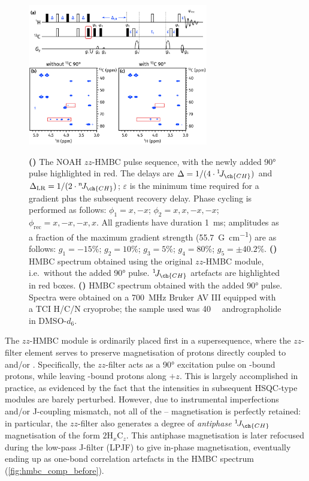 \documentclass[a4paper,11pt]{article}
\newcommand{\proton}{\ch{^{1}H}}
\newcommand{\carbonbulk}{\ch{^{12}C}}
\newcommand{\carbon}{\ch{^{13}C}}
\newcommand{\nitrogen}{\ch{^{15}N}}
\newcommand{\onejch}{{}^1\!J_{\ch{CH}}}
\newcommand{\njch}{{}^n\!J_{\ch{CH}}}
\newcommand*{\andro}{Spectra were obtained on a \SI{700}{\MHz} Bruker AV III equipped with a TCI H/C/N cryoprobe; the sample used was \SI{40}{\milli\molar} andrographolide in DMSO-\(d_6\).}
\begin{document}
\begin{refsection}
\begin{figure}[ht]
    \centering
    \includegraphics[width=0.7\textwidth]{hmbc_comp.png}
    {\label{fig:hmbc_comp_pulprog}}
    {\label{fig:hmbc_comp_before}}
    {\label{fig:hmbc_comp_after}}
    \caption{
        \textbf{()} The NOAH \(zz\)-HMBC pulse sequence, with the newly added \carbon{} \ang{90} pulse highlighted in red.
        The delays are \(\Delta = 1/(4 \cdot \onejch)\) and \(\Delta_{\text{LR}} = 1/(2 \cdot \njch)\); \(\varepsilon\) is the minimum time required for a gradient plus the subsequent recovery delay.
        Phase cycling is performed as follows: \(\phi_1 = x, -x\); \(\phi_2 = x, x, -x, -x\); \(\phi_{\text{rec}} = x, -x, -x, x\).
        All gradients have duration \SI{1}{ms}; amplitudes as a fraction of the maximum gradient strength (\SI{55.7}{G\per\cm}) are as follows: \(g_1 = -15\%\); \(g_2 = 10\%\); \(g_3 = 5\%\); \(g_4 = 80\%\); \(g_5 = \pm 40.2\%\).
        \textbf{()} HMBC spectrum obtained using the original \(zz\)-HMBC module, i.e.\ without the added \ang{90} pulse.
        \(\onejch{}\) artefacts are highlighted in red boxes.
        \textbf{()} HMBC spectrum obtained with the added \ang{90} pulse.
        \andro{}
    }
    \label{fig:hmbc_comp}
\end{figure}

The \(zz\)-HMBC module is ordinarily placed first in a supersequence, where the \(zz\)-filter element serves to preserve magnetisation of protons directly coupled to \carbon{} and/or \nitrogen{}.\autocite{Kupce2018CC,Kupce2019JMR}
Specifically, the \(zz\)-filter acts as a \ang{90} excitation pulse on \carbonbulk{}-bound protons, while leaving \carbon{}-bound protons along \(+z\).
This is largely accomplished in practice, as evidenced by the fact that the intensities in subsequent HSQC-type modules are barely perturbed.
However, due to instrumental imperfections and/or J-coupling mismatch, not all of the \carbon{}--\proton{} magnetisation is perfectly retained: in particular, the \(zz\)-filter also generates a degree of \textit{antiphase} \(\onejch{}\) magnetisation of the form \(2\mathrm{H}_x\mathrm{C}_z\).
This antiphase magnetisation is later refocused during the low-pass J-filter (LPJF) to give in-phase magnetisation, eventually ending up as one-bond correlation artefacts in the HMBC spectrum (\cref{fig:hmbc_comp_before}).


\end{refsection}
\end{document}
